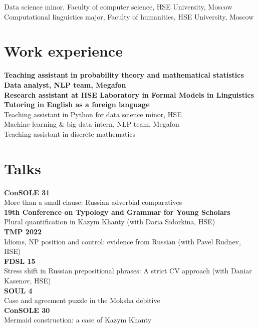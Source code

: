 \documentclass[11pt]{article} %
\begin{document}
 Data science minor, Faculty of computer science, HSE University, Moscow\\
 Computational linguistics major, Faculty of humanities, HSE University, Moscow


\section*{Work experience}

 \textbf{Teaching assistant in probability theory and mathematical statistics}\\
 \textbf{Data analyst, NLP team, Megafon}\\
 \textbf{Research assistant at HSE Laboratory in Formal Models in Linguistics}\\
 \textbf{Tutoring in English as a foreign language}\\
 Teaching assistant in Python for data science minor, HSE\\
 Machine learning \& big data intern, NLP team, Megafon\\
Teaching assistant in discrete mathematics

\section*{Talks}

 \textbf{ConSOLE 31}\\ More than a small clause: Russian adverbial comparatives\\
 \textbf{19th Conference on Typology and Grammar for Young Scholars}\\ Plural quantification in Kazym Khanty (with Daria Sidorkina, HSE)\\
 \textbf{TMP 2022} \\Idioms, NP position and control: evidence from Russian (with Pavel Rudnev, HSE)\\
 \textbf{FDSL 15} \\Stress shift in Russian prepositional phrases: A strict CV approach (with Daniar Kasenov, HSE)\\
 \textbf{SOUL 4}\\ Case and agreement puzzle in the Moksha debitive\\
 \textbf{ConSOLE 30}\\ Mermaid construction: a case of Kazym Khanty\\
\end{document}
